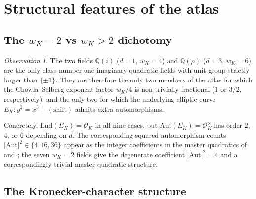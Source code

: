 \documentclass[11pt]{amsart}
\theoremstyle{plain}
\theoremstyle{definition}
\theoremstyle{remark}
\newtheorem*{observation}{Observation}
\newcommand{\Q}{\mathbb{Q}}
\newcommand{\Aut}{\mathrm{Aut}}
\begin{document}
\section{Structural features of the atlas}\label{sec:structure}

\subsection{The $w_K = 2$ vs $w_K > 2$ dichotomy}

\begin{observation}\label{obs:two-special-fields}
The two fields $\Q(i)$ ($d = 1$, $w_K = 4$) and $\Q(\rho)$ ($d = 3$,
$w_K = 6$) are the only class-number-one imaginary quadratic fields with
unit group strictly larger than $\{\pm 1\}$. They are therefore the only
two members of the atlas for which the Chowla--Selberg exponent factor
$w_K/4$ is non-trivially fractional ($1$ or $3/2$, respectively), and the
only two for which the underlying elliptic curve $E_K: y^{2} = x^{3} + (\text{shift})$
admits extra automorphisms.

Concretely, $\mathrm{End}(E_K) = \mathcal{O}_K$ in all nine cases, but
$\Aut(E_K) = \mathcal{O}_K^{\times}$ has order $2$, $4$, or $6$ depending
on $d$. The corresponding squared automorphism counts
$|\Aut|^{2} \in \{4, 16, 36\}$ appear as the integer coefficients in the
master quadratics of \cite[\S 8]{paper-gstar-A} and \cite[\S 15]{paper-gstar-A};
the seven $w_K = 2$ fields give the degenerate coefficient $|\Aut|^{2} = 4$
and a correspondingly trivial master quadratic structure.
\end{observation}

\subsection{The Kronecker-character structure}
\end{document}
